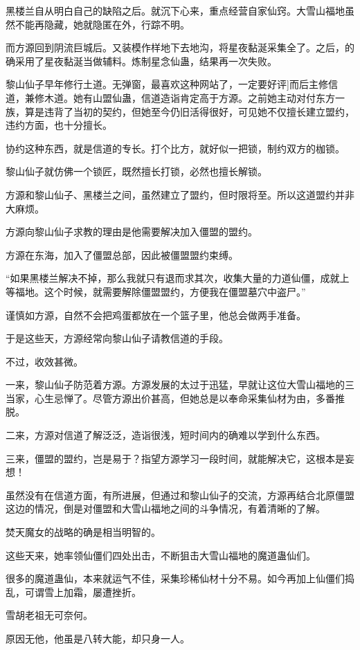 \begin{this_body}
黑楼兰自从明白自己的缺陷之后。就沉下心来，重点经营自家仙窍。大雪山福地虽然不能再隐藏，她就隐匿在外，行踪不明。

而方源回到阴流巨城后。又装模作样地下去地沟，将星夜黏涎采集全了。之后，的确采用了星夜黏涎当做辅料。炼制星念仙蛊，结果再一次失败。

黎山仙子早年修行土道。无弹窗，最喜欢这种网站了，一定要好评]而后主修信道，兼修木道。她有山盟仙蛊，信道造诣肯定高于方源。之前她主动对付东方一族，算是违背了当初的契约，但她至今仍旧活得很好，可见她不仅擅长建立盟约，违约方面，也十分擅长。

协约这种东西，就是信道的专长。打个比方，就好似一把锁，制约双方的枷锁。

黎山仙子就仿佛一个锁匠，既然擅长打锁，必然也擅长解锁。

方源和黎山仙子、黑楼兰之间，虽然建立了盟约，但时限将至。所以这道盟约并非大麻烦。

方源向黎山仙子求教的理由是他需要解决加入僵盟的盟约。

方源在东海，加入了僵盟总部，因此被僵盟盟约束缚。

“如果黑楼兰解决不掉，那么我就只有退而求其次，收集大量的力道仙僵，成就上等福地。这个时候，就需要解除僵盟盟约，方便我在僵盟墓穴中盗尸。”

谨慎如方源，自然不会把鸡蛋都放在一个篮子里，他总会做两手准备。

于是这些天，方源经常向黎山仙子请教信道的手段。

不过，收效甚微。

一来，黎山仙子防范着方源。方源发展的太过于迅猛，早就让这位大雪山福地的三当家，心生忌惮了。尽管方源出价甚高，但她总是以奉命采集仙材为由，多番推脱。

二来，方源对信道了解泛泛，造诣很浅，短时间内的确难以学到什么东西。

三来，僵盟的盟约，岂是易于？指望方源学习一段时间，就能解决它，这根本是妄想！

虽然没有在信道方面，有所进展，但通过和黎山仙子的交流，方源再结合北原僵盟这边的情况，倒是对僵盟和大雪山福地之间的斗争情况，有着清晰的了解。

焚天魔女的战略的确是相当明智的。

这些天来，她率领仙僵们四处出击，不断狙击大雪山福地的魔道蛊仙们。

很多的魔道蛊仙，本来就运气不佳，采集珍稀仙材十分不易。如今再加上仙僵们捣乱，可谓雪上加霜，屡遭挫折。

雪胡老祖无可奈何。

原因无他，他虽是八转大能，却只身一人。


\end{this_body}
